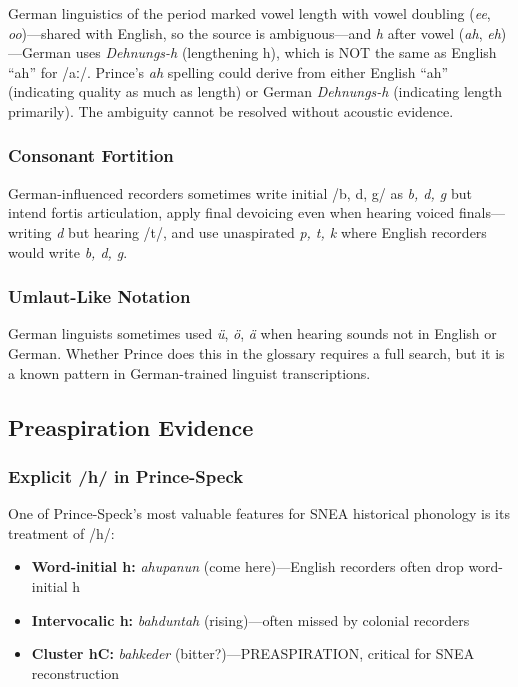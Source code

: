 German linguistics of the period marked vowel length with vowel doubling
(\textit{ee}, \textit{oo})---shared with English, so the source is
ambiguous---and \textit{h} after vowel (\textit{ah}, \textit{eh})---German
uses \textit{Dehnungs-h} (lengthening h), which is NOT the same as English
``ah'' for /aː/. Prince's \textit{ah} spelling could derive from either
English ``ah'' (indicating quality as much as length) or German
\textit{Dehnungs-h} (indicating length primarily). The ambiguity cannot be
resolved without acoustic evidence.

\subsubsection{Consonant Fortition}

German-influenced recorders sometimes write initial /b, d, g/ as \textit{b,
d, g} but intend fortis articulation, apply final devoicing even when
hearing voiced finals---writing \textit{d} but hearing /t/, and use
unaspirated \textit{p, t, k} where English recorders would write \textit{b,
d, g}.

\subsubsection{Umlaut-Like Notation}

German linguists sometimes used \textit{ü}, \textit{ö}, \textit{ä} when
hearing sounds not in English or German. Whether Prince does this in the
glossary requires a full search, but it is a known pattern in
German-trained linguist transcriptions.

\subsection{Preaspiration Evidence}

\subsubsection{Explicit /h/ in Prince-Speck}

One of Prince-Speck's most valuable features for SNEA historical phonology
is its treatment of /h/:

\begin{itemize}
  \item \textbf{Word-initial h:} \textit{ahupanun} (come here)---English
    recorders often drop word-initial h
  \item \textbf{Intervocalic h:} \textit{bahduntah} (rising)---often missed
    by colonial recorders
  \item \textbf{Cluster hC:} \textit{bahkeder} (bitter?)---PREASPIRATION,
    critical for SNEA reconstruction
\end{itemize}

